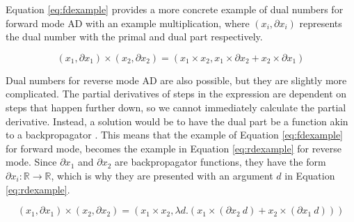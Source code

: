 \documentclass{article}
\begin{document}
            Equation \ref{eq:fdexample} provides a more concrete example of dual numbers for forward mode AD with an example multiplication, where $(x_i, \partial x_i)$ represents the dual number with the primal and dual part respectively.

            \begin{equation} \label{eq:fdexample}
                (x_1,\partial x_1)\times(x_2,\partial x_2)=(x_1\times x_2, x_1\times\partial x_2+x_2\times\partial x_1)
            \end{equation}

            Dual numbers for reverse mode AD are also possible, but they are slightly more complicated.
            The partial derivatives of steps in the expression are dependent on steps that happen further down, so we cannot immediately calculate the partial derivative.
            Instead, a solution would be to have the dual part be a function akin to a backpropagator \cite{wang2019demystifying,smeding2022efficient}.
            This means that the example of Equation \ref{eq:fdexample} for forward mode, becomes the example in Equation \ref{eq:rdexample} for reverse mode.
            Since $\partial x_1$ and $\partial x_2$ are backpropagator functions, they have the form $\partial x_i:\mathbb{R}\to\mathbb{R}$, which is why they are presented with an argument $d$ in Equation \ref{eq:rdexample}.

            \begin{equation} \label{eq:rdexample}
                (x_1,\partial x_1)\times(x_2,\partial x_2)=\left(x_1\times x_2,\lambda d.\left(x_1\times(\partial x_2\ d) + x_2\times(\partial x_1\ d)\right)\right)
            \end{equation}
\end{document}
